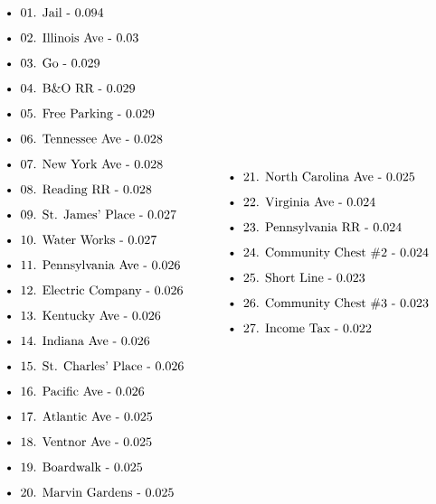 \documentclass[12pt]{article}
\begin{document}
\begin{align*}
\label{Tile Probabilities}
\centering
\begin{minipage}{0.5\textwidth}
\begin{flushleft}
\begin{itemize}
  \item {01. Jail - 0.094}
  \item {02. Illinois Ave - 0.03}
  \item {03. Go - 0.029}
  \item {04. B\&O RR - 0.029}
  \item {05. Free Parking - 0.029}
  \item {06. Tennessee Ave - 0.028}
  \item {07. New York Ave - 0.028}
  \item {08. Reading RR - 0.028}
  \item {09. St. James' Place - 0.027}
  \item {10. Water Works - 0.027}
  \item {11. Pennsylvania Ave - 0.026}
  \item {12. Electric Company - 0.026}
  \item {13. Kentucky Ave - 0.026}
  \item {14. Indiana Ave - 0.026}
  \item {15. St. Charles' Place - 0.026}
  \item {16. Pacific Ave - 0.026}
  \item {17. Atlantic Ave - 0.025}
  \item {18. Ventnor Ave - 0.025}
  \item {19. Boardwalk - 0.025}
  \item {20. Marvin Gardens - 0.025}
\end{itemize}
\end{flushleft}
\end{minipage}
~
\begin{minipage}{0.5\textwidth}
\begin{flushleft}
\begin{itemize}
  \item {21. North Carolina Ave - 0.025}
  \item {22. Virginia Ave - 0.024}
  \item {23. Pennsylvania RR - 0.024}
  \item {24. Community Chest \#2 - 0.024}
  \item {25. Short Line - 0.023}
  \item {26. Community Chest \#3 - 0.023}
  \item {27. Income Tax - 0.022}

\end{itemize}
\end{flushleft}
\end{minipage}
\end{align*}
\end{document}
